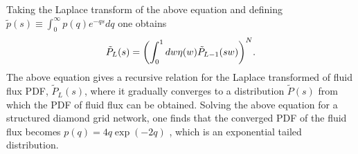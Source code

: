 \documentclass[%
reprint,
 amsmath,amssymb,
 aps,
prl,
]{revtex4-1}
\begin{document}
Taking the Laplace transform of the above equation and defining $\tilde p(s) \equiv \int_0^{\infty} p(q) e^{-qs} dq$ one obtains
%
%
%
\begin{align}
  {\tilde P_L(s) = \left(\int_0^1 d w \eta(w) \tilde P_{L-1}(s w)  \right)^{N}}. \label{eq:main-laplace}
\end{align}
%
The above equation gives a recursive relation for the Laplace transformed of fluid flux PDF, $\tilde P_L(s)$, where it gradually converges to a distribution $\tilde P(s)$ from which the PDF of fluid flux can be obtained. Solving the above equation for a structured diamond grid network, one finds that the converged PDF of the fluid flux becomes $p(q) = 4q\exp(-2q)$ \cite{liu1995force,coppersmith1996model,alim2017local}, which is an exponential tailed distribution. 


\end{document}
